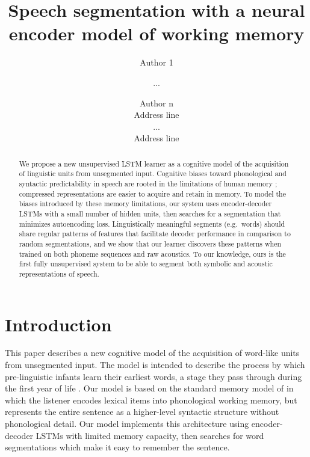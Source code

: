 \documentclass[11pt,letterpaper]{article}
\title{Speech segmentation with a neural encoder model of working memory}
\author{Author 1 \and ... \and Author n \\
        Address line \\ ... \\ Address line}
\date{}
\begin{document}
\maketitle

\begin{abstract}
We propose a new unsupervised LSTM learner as a cognitive model of the acquisition of linguistic units from unsegmented input.
Cognitive biases toward phonological and syntactic predictability in speech are rooted in the limitations of human memory \cite{Baddeley85};
compressed representations are easier to acquire and retain in memory.
To model the biases introduced by these memory limitations, our system uses encoder-decoder LSTMs with a small number of hidden units,
then searches for a segmentation that minimizes autoencoding loss.
Linguistically meaningful segments (e.g.\ words) should share regular patterns of features that facilitate decoder performance in comparison to random segmentations,
and we show that our learner discovers these patterns when trained on both phoneme sequences and raw acoustics.
To our knowledge, ours is the first fully unsupervised system to be able to segment both symbolic and acoustic representations of speech.
\end{abstract}


\section{Introduction}

This paper describes a new cognitive model of the acquisition of
word-like units from unsegmented input. The model is intended to
describe the process by which pre-linguistic infants learn their
earliest words, a stage they pass through during the first year of
life \cite{Jusczyk95,Bergelson12}. Our model is based on the standard
memory model of  in which the listener encodes
lexical items into phonological working memory, but represents the
entire sentence as a higher-level syntactic structure without
phonological detail. Our model implements this architecture using
encoder-decoder LSTMs with limited memory capacity, then searches for
word segmentations which make it easy to remember the sentence.
\end{document}
